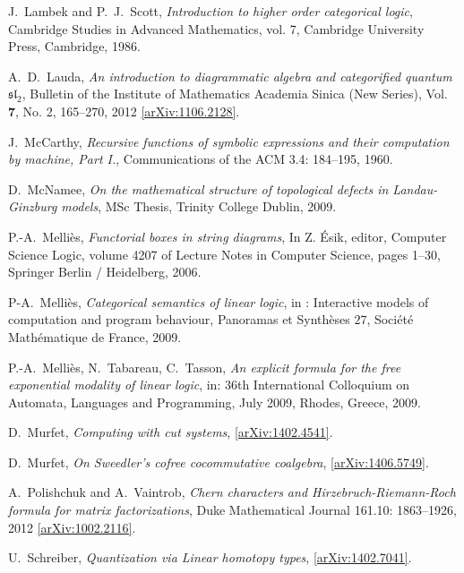\documentclass[english,letter paper,12pt,reqno]{article}
\theoremstyle{example}
\numberwithin{equation}{section}
\begin{document}
\begin{thebibliography}{BHLS03}
J.~Lambek and P.~J.~Scott, \textsl{Introduction to higher order categorical logic}, Cambridge Studies in Advanced Mathematics, vol. 7, Cambridge University Press, Cambridge, 1986.

A.~D.~Lauda, \textsl{An introduction to diagrammatic algebra and categorified quantum $\mathfrak{sl}_2$}, Bulletin of the Institute of Mathematics Academia Sinica (New Series), Vol. \textbf{7}, No. 2, 165--270, 2012 \href{http://arxiv.org/abs/1106.2128}{[arXiv:1106.2128]}.

J.~McCarthy, \textsl{Recursive functions of symbolic expressions and their computation by machine, Part I.}, Communications of the ACM 3.4: 184--195, 1960.

D.~McNamee, \textsl{On the mathematical structure of topological defects in
  {L}andau-{G}inzburg models}, MSc Thesis, Trinity College Dublin, 2009.
  
P.-A.~Melli\`{e}s, \textsl{Functorial boxes in string diagrams}, In Z. \'{E}sik, editor, Computer Science Logic,
volume 4207 of Lecture Notes in Computer Science, pages 1--30, Springer Berlin / Heidelberg,
2006.

P-A.~Melli\`{e}s, \textsl{Categorical semantics of linear logic}, in : Interactive models of computation and program behaviour, Panoramas et Synth\`{e}ses $27$, Soci\'{e}t\'{e} Math\'{e}matique de France, 2009.

P.-A.~Melli\`{e}s, N.~Tabareau, C.~Tasson, \textsl{An explicit formula for the free exponential modality of linear logic}, in: 36th International Colloquium on Automata, Languages and Programming, July 2009, Rhodes, Greece, 2009.

D.~Murfet, \textsl{Computing with cut systems}, \href{http://arxiv.org/abs/1402.4541}{[arXiv:1402.4541]}.

D.~Murfet, \textsl{On Sweedler's cofree cocommutative coalgebra}, \href{http://arxiv.org/abs/1406.5749}{[arXiv:1406.5749]}.

A.~Polishchuk and A.~Vaintrob, \textsl{Chern characters and {H}irzebruch-{R}iemann-{R}och formula for matrix factorizations}, Duke Mathematical Journal 161.10: 1863--1926, 2012 \href{http://arxiv.org/abs/1002.2116}{[arXiv:1002.2116]}. 

U.~Schreiber, \textsl{Quantization via {L}inear homotopy types}, \href{http://arxiv.org/abs/1402.7041}{[arXiv:1402.7041]}.


\end{thebibliography}
\end{document}
